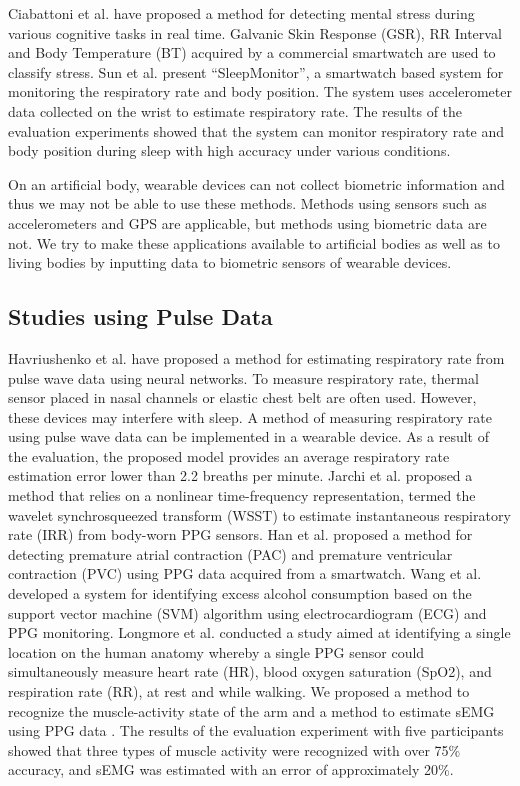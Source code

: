 \documentclass[sigchi,authordraft]{acmart}
\begin{document}
Ciabattoni et al. \cite{smartwatch_stress_detection} have proposed a method for detecting mental stress during various cognitive tasks in real time. Galvanic Skin Response (GSR), RR Interval and Body Temperature (BT) acquired by a commercial smartwatch are used to classify stress.
Sun et al. \cite{SleepMonitor} present ``SleepMonitor'', a smartwatch based system for monitoring the respiratory rate and body position. The system uses accelerometer data collected on the wrist to estimate respiratory rate. The results of the evaluation experiments showed that the system can monitor respiratory rate and body position during sleep with high accuracy under various conditions.\par

On an artificial body, wearable devices can not collect biometric information and thus we may not be able to use these methods. Methods using sensors such as accelerometers and GPS are applicable, but methods using biometric data are not. We try to make these applications available to artificial bodies as well as to living bodies by inputting data to biometric sensors of wearable devices.


\subsection{Studies using Pulse Data}
Havriushenko et al. \cite{respiratory_rate_estimation1} have proposed a method for estimating respiratory rate from pulse wave data using neural networks. To measure respiratory rate, thermal sensor placed in nasal channels or elastic chest belt are often used. However, these devices may interfere with sleep. A method of measuring respiratory rate using pulse wave data can be implemented in a wearable device. As a result of the evaluation, the proposed model provides an average respiratory rate estimation error lower than 2.2 breaths per minute.
Jarchi et al. \cite{respiratory_rate_estimation2} proposed a method that relies on a nonlinear time-frequency representation, termed the wavelet synchrosqueezed transform (WSST) to estimate instantaneous respiratory rate (IRR) from body-worn PPG sensors.
Han et al. \cite{arrhythmia_detection} proposed a method for detecting premature atrial contraction (PAC) and premature ventricular contraction (PVC) using PPG data acquired from a smartwatch.
Wang et al. \cite{alcohol_detection} developed a system for identifying excess alcohol consumption based on the support vector machine (SVM) algorithm using electrocardiogram (ECG) and PPG monitoring.
Longmore et al. \cite{ppg_location} conducted a study aimed at identifying a single location on the human anatomy whereby a single PPG sensor could simultaneously measure heart rate (HR), blood oxygen saturation (SpO2), and respiration rate (RR), at rest and while walking.
We proposed a method to recognize the muscle-activity state of the arm and a method to estimate sEMG using PPG data \cite{semg_okamoto}. The results of the evaluation experiment with five participants showed that three types of muscle activity were recognized with over 75\% accuracy, and sEMG was estimated with an error of approximately 20\%.\par
\end{document}
